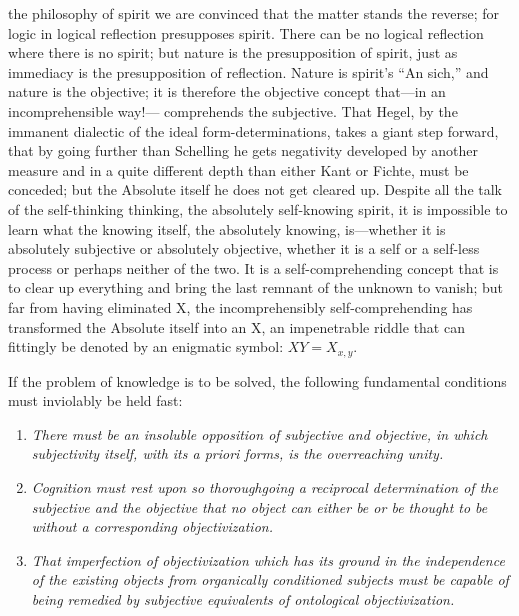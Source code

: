 \documentclass[12pt]{article}
\begin{document}
the philosophy of spirit we are convinced that the matter stands the
reverse; for logic in logical reflection presupposes spirit. There can be
no logical reflection where there is no spirit; but nature is the
presupposition of spirit, just as immediacy is the presupposition of
reflection. Nature is spirit's ``An sich,'' and nature is the objective; it
is therefore the objective concept that—in an incomprehensible way!—
comprehends the subjective. That Hegel, by the immanent dialectic of the
ideal form-determinations, takes a giant step forward, that by going
further than Schelling he gets negativity developed by another measure and
in a quite different depth than either Kant or Fichte, must be conceded;
but the Absolute itself he does not get cleared up. Despite all the talk of
the self-thinking thinking, the absolutely self-knowing spirit, it is
impossible to learn what the knowing itself, the absolutely knowing,
is—whether it is absolutely subjective or absolutely objective, whether it
is a self or a self-less process or perhaps neither of the two. It is a
self-comprehending concept that is to clear up everything and bring the
last remnant of the unknown to vanish; but far from having eliminated X,
the incomprehensibly self-comprehending has transformed the Absolute itself
into an X, an impenetrable riddle that can fittingly be denoted by an
enigmatic symbol: $XY = X_{x,y}$.

If the problem of knowledge is to be solved, the following fundamental
conditions must inviolably be held fast:

\begin{enumerate}
\item[1)] \emph{There must be an insoluble opposition of subjective and
  objective, in which subjectivity itself, with its a priori forms, is the
  overreaching unity.}
\item[2)] \emph{Cognition must rest upon so thoroughgoing a reciprocal
  determination of the subjective and the objective that no object can
  either be or be thought to be without a corresponding objectivization.}
\item[3)] \emph{That imperfection of objectivization which has its ground in
  the independence of the existing objects from organically conditioned
  subjects must be capable of being remedied by subjective equivalents of
  ontological objectivization.}
\end{enumerate}
\end{document}
